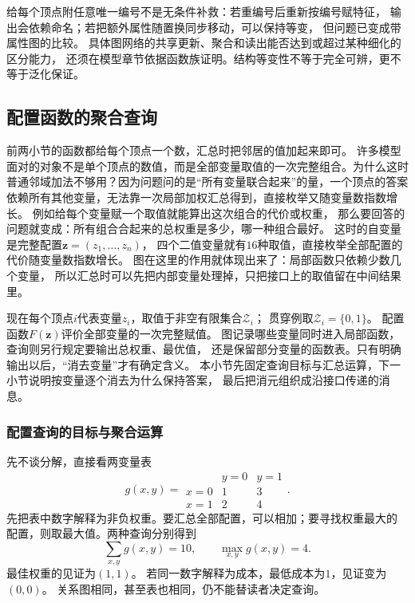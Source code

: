 给每个顶点附任意唯一编号不是无条件补救：若重编号后重新按编号赋特征，
输出会依赖命名；若把额外属性随置换同步移动，可以保持等变，
但问题已变成带属性图的比较。
具体图网络的共享更新、聚合和读出能否达到或超过某种细化的区分能力，
还须在模型章节依据函数族证明。结构等变性不等于完全可辨，更不等于泛化保证。

\subsection{配置函数的聚合查询}
\label{sec:graph-theory-semiring-dynamic-programming}

前两小节的函数都给每个顶点一个数，汇总时把邻居的值加起来即可。
许多模型面对的对象不是单个顶点的数值，而是全部变量取值的一次完整组合。为什么这时普通邻域加法不够用？因为问题问的是“所有变量联合起来”的量，一个顶点的答案依赖所有其他变量，无法靠一次局部加权汇总得到，直接枚举又随变量数指数增长。
例如给每个变量赋一个取值就能算出这次组合的代价或权重，
那么要回答的问题就变成：所有组合合起来的总权重是多少，哪一种组合最好。
这时的自变量是完整配置\(\bm z=(z_1,\ldots,z_n)\)，
四个二值变量就有\(16\)种取值，直接枚举全部配置的代价随变量数指数增长。
图在这里的作用就体现出来了：局部函数只依赖少数几个变量，
所以汇总时可以先把内部变量处理掉，只把接口上的取值留在中间结果里。

现在每个顶点\(i\)代表变量\(z_i\)，取值于非空有限集合\(\mathcal Z_i\)；
贯穿例取\(\mathcal Z_i=\{0,1\}\)。
配置函数\(F(\bm z)\)评价全部变量的一次完整赋值。
图记录哪些变量同时进入局部函数，查询则另行规定要输出总权重、最优值，
还是保留部分变量的函数表。只有明确输出以后，“消去变量”才有确定含义。
本小节先固定查询目标与汇总运算，下一小节说明按变量逐个消去为什么保持答案，
最后把消元组织成沿接口传递的消息。

\subsubsection{配置查询的目标与聚合运算}

先不谈分解，直接看两变量表
\[
  g(x,y)=
  \begin{array}{c|cc}
    &y=0&y=1\\ \hline
    x=0&1&3\\
    x=1&2&4
  \end{array}.
\]
先把表中数字解释为非负权重。要汇总全部配置，可以相加；要寻找权重最大的
配置，则取最大值。两种查询分别得到
\[
  \sum_{x,y}g(x,y)=10,\qquad \max_{x,y}g(x,y)=4.
\]
最佳权重的见证为\((1,1)\)。
若同一数字解释为成本，最低成本为\(1\)，见证变为\((0,0)\)。
关系图相同，甚至表也相同，仍不能替读者决定查询。

